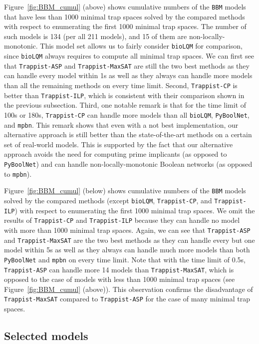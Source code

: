 \documentclass[preprint,12pt]{elsarticle}
\begin{document}
Figure~\ref{fig:BBM_cumul} (above) shows cumulative numbers of the \texttt{BBM} models that have less than 1000 minimal trap spaces solved by the compared methods with respect to enumerating the first 1000 minimal trap spaces.
The number of such models is 134 (per all 211 models), and 15 of them are non-locally-monotonic.
This model set allows us to fairly consider \texttt{bioLQM} for comparison, since \texttt{bioLQM} always requires to compute all minimal trap spaces.
We can first see that \texttt{Trappist-ASP} and \texttt{Trappist-MaxSAT} are still the two best methods as they can handle every model within 1s as well as they always can handle more models than all the remaining methods on every time limit.
Second, \texttt{Trappist-CP} is better than \texttt{Trappist-ILP}, which is consistent with their comparison shown in the previous subsection.
Third, one notable remark is that for the time limit of 100s or 180s, \texttt{Trappist-CP} can handle more models than all \texttt{bioLQM}, \texttt{PyBoolNet}, and \texttt{mpbn}.
This remark shows that even with a not best implementation, our alternative approach is still better than the state-of-the-art methods on a certain set of real-world models.
This is supported by the fact that our alternative approach avoids the need for computing prime implicants (as opposed to \texttt{PyBoolNet}) and can handle non-locally-monotonic Boolean networks (as opposed to \texttt{mpbn}).


Figure~\ref{fig:BBM_cumul} (below) shows cumulative numbers of the \texttt{BBM} models solved by the compared methods (except \texttt{bioLQM}, \texttt{Trappist-CP}, and \texttt{Trappist-ILP}) with respect to enumerating the first 1000 minimal trap spaces.
We omit the results of \texttt{Trappist-CP} and \texttt{Trappist-ILP} because they can handle no model with more than 1000 minimal trap spaces.
Again, we can see that \texttt{Trappist-ASP} and \texttt{Trappist-MaxSAT} are the two best methods as they can handle every but one model within 5s as well as they always can handle much more models than both \texttt{PyBoolNet} and \texttt{mpbn} on every time limit.
Note that with the time limit of 0.5s, \texttt{Trappist-ASP} can handle more 14 models than \texttt{Trappist-MaxSAT}, which is opposed to the case of models with less than 1000 minimal trap spaces (see Figure~\ref{fig:BBM_cumul} (above)).
This observation confirms the disadvantage of \texttt{Trappist-MaxSAT} compared to \texttt{Trappist-ASP} for the case of many minimal trap spaces.


\subsection{Selected models}
\end{document}
